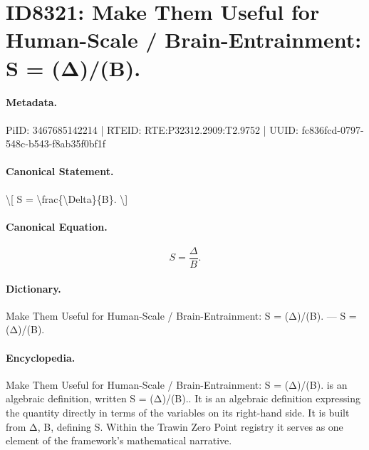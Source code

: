 \section*{ID8321: Make Them Useful for Human-Scale / Brain-Entrainment: S = (Δ)/(B).}
\paragraph{Metadata.}
PiID: 3467685142214 | RTEID: RTE:P32312.2909:T2.9752 | UUID: fc836fcd-0797-548c-b543-f8ab35f0bf1f

\paragraph{Canonical Statement.}
\textbackslash{}[ S = \textbackslash{}frac\{\textbackslash{}Delta\}\{B\}. \textbackslash{}]

\paragraph{Canonical Equation.}
\[
S = \frac{\Delta}{B}.
\]

\paragraph{Dictionary.}
Make Them Useful for Human-Scale / Brain-Entrainment: S = (Δ)/(B). — S = (Δ)/(B).

\paragraph{Encyclopedia.}
Make Them Useful for Human-Scale / Brain-Entrainment: S = (Δ)/(B). is an algebraic definition, written S = (Δ)/(B).. It is an algebraic definition expressing the quantity directly in terms of the variables on its right-hand side. It is built from Δ, B, defining S. Within the Trawin Zero Point registry it serves as one element of the framework's mathematical narrative.
